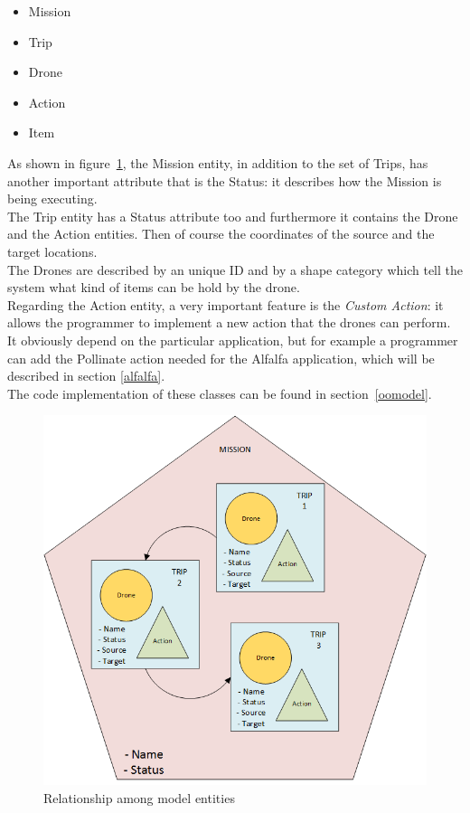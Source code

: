 \begin{itemize}
\itemsep2pt
\item{
Mission
}
\item{
Trip
}
\item{
Drone
}
\item{
Action
}
\item{
Item
}
\end{itemize}

As shown in figure~\ref{fig:EntityRelationship}, the Mission entity, in addition to the set of Trips, has another important attribute that is the Status: it describes how the Mission is being executing.
\\
The Trip entity has a Status attribute too and furthermore it contains the Drone and the Action entities. Then of course the coordinates of the source and the target locations.
\\
The Drones are described by an unique ID and by a shape category which tell the system what kind of items can be hold by the drone.
\\
Regarding the Action entity, a very important feature is the \textit{Custom Action}: it allows the programmer to implement a new action that the drones can perform.
It obviously depend on the particular application, but for example a programmer can add the Pollinate action needed for the Alfalfa application\cite{alfalfa}, which will be described in section \ref{alfalfa}.
\\
The code implementation of these classes can be found in section~\ref{oomodel}.

\newpage

\begin{figure}[htb]
  \centering
  \includegraphics[width=\linewidth]
  {pictures/EntityRelationship.png}
  \caption{Relationship among model entities}
  \label{fig:EntityRelationship}
\end{figure}


